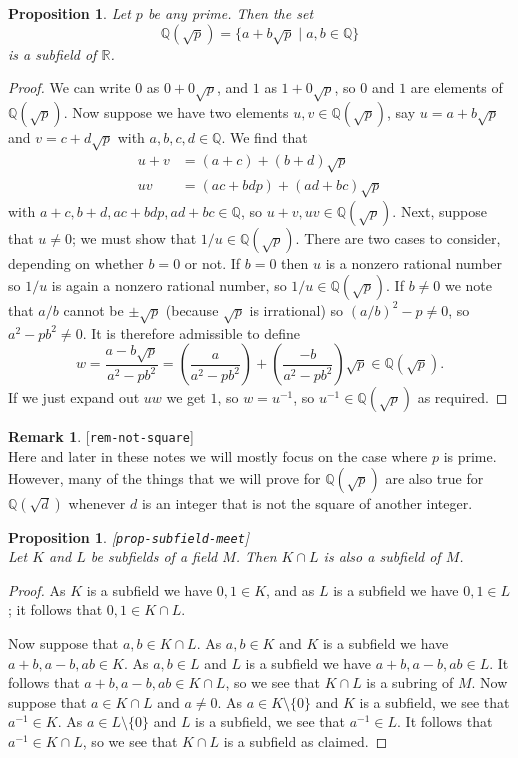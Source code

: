 \documentclass{amsart}
\newcommand{\lbl}[1]{\label{#1}\textup{[\texttt{#1}]}\ \\}
\newcommand{\lbl}{\label}
\newcommand{\Q}         {{\mathbb{Q}}}
\newcommand{\R}         {{\mathbb{R}}}
\newcommand{\sm}        {\setminus}
\newcommand{\st}        {\;|\;}
\renewcommand{\:}{\colon}
\newtheorem{proposition}[theorem]{Proposition}
\theoremstyle{definition}
\newtheorem{remark}[theorem]{Remark}
\begin{document}
\begin{proposition}\label{prop-Qp-R}
 Let $p$ be any prime.  Then the set
 \[ \Q(\sqrt{p}) = \{a+b\sqrt{p}\st a,b\in\Q\} \]
 is a subfield of $\R$.  
\end{proposition}
\begin{proof}
 We can write $0$ as $0+0\sqrt{p}$, and $1$ as $1+0\sqrt{p}$, so $0$
 and $1$ are elements of $\Q(\sqrt{p})$.  Now suppose we have two
 elements $u,v\in\Q(\sqrt{p})$, say $u=a+b\sqrt{p}$ and
 $v=c+d\sqrt{p}$ with $a,b,c,d\in\Q$.  We find that
 \begin{align*}
  u+v &= (a+c)+(b+d)\sqrt{p} \\
  uv &= (ac+bdp) + (ad+bc)\sqrt{p}
 \end{align*}
 with $a+c,b+d,ac+bdp,ad+bc\in\Q$, so $u+v,uv\in\Q(\sqrt{p})$.  Next,
 suppose that $u\neq 0$; we must show that $1/u\in\Q(\sqrt{p})$.
 There are two cases to consider, depending on whether $b=0$ or not.  
 If $b=0$ then $u$ is a nonzero rational number so $1/u$ is again a
 nonzero rational number, so $1/u\in\Q(\sqrt{p})$.  If $b\neq 0$ we
 note that $a/b$ cannot be $\pm\sqrt{p}$ (because $\sqrt{p}$ is
 irrational) so $(a/b)^2-p\neq 0$, so $a^2-pb^2\neq 0$.  It is
 therefore admissible to define
 \[ w = \frac{a-b\sqrt{p}}{a^2-pb^2} = 
      \left(\frac{a}{a^2-pb^2}\right) + 
      \left(\frac{-b}{a^2-pb^2}\right)\sqrt{p} \in\Q(\sqrt{p}).
 \]
 If we just expand out $uw$ we get $1$, so $w=u^{-1}$, so
 $u^{-1}\in\Q(\sqrt{p})$ as required.
\end{proof}
\begin{remark}\lbl{rem-not-square}
 Here and later in these notes we will mostly focus on the case where
 $p$ is prime.  However, many of the things that we will prove for
 $\Q(\sqrt{p})$ are also true for $\Q(\sqrt{d})$ whenever $d$ is an
 integer that is not the square of another integer. 
\end{remark}

\begin{proposition}\lbl{prop-subfield-meet}
 Let $K$ and $L$ be subfields of a field $M$.  Then $K\cap L$ is also
 a subfield of $M$.
\end{proposition}
\begin{proof}
 As $K$ is a subfield we have $0,1\in K$, and as $L$ is a subfield we
 have $0,1\in L$; it follows that $0,1\in K\cap L$.

 Now suppose that $a,b\in K\cap L$.  As $a,b\in K$ and $K$ is a
 subfield we have $a+b,a-b,ab\in K$.  As $a,b\in L$ and $L$ is a
 subfield we have $a+b,a-b,ab\in L$.  It follows that
 $a+b,a-b,ab\in K\cap L$, so we see that $K\cap L$ is a subring of
 $M$.  Now suppose that $a\in K\cap L$ and $a\neq 0$. 
 As $a\in K\sm\{0\}$ and $K$ is a subfield, we see that $a^{-1}\in K$.
 As $a\in L\sm\{0\}$ and $L$ is a subfield, we see that $a^{-1}\in L$.
 It follows that $a^{-1}\in K\cap L$, so we see that $K\cap L$ is a
 subfield as claimed.
\end{proof}
\end{document}
